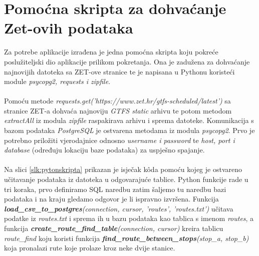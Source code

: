 \documentclass[zavrsnirad]{fer}
\begin{document}
\section{Pomoćna skripta za dohvaćanje Zet-ovih podataka}
\label{sec:skripta}
Za potrebe aplikacije izrađena je jedna pomoćna skripta koju pokreće poslužiteljski dio aplikacije prilikom pokretanja. Ona je zadužena za dohvaćanje najnovijih datoteka sa ZET-ove stranice te je napisana u Pythonu koristeći module \textit{psycopg2, requests i zipfile}.\\\\
Pomoću metode \textit{requests.get('https://www.zet.hr/gtfs-scheduled/latest')} sa stranice ZET-a dohvaća najnoviju \textit{GTFS static} arhivu te potom metodom \textit{extractAll} iz modula \textit{zipfile} raspakirava arhivu i sprema datoteke. Komunikacija s bazom podataka \textit{PostgreSQL} je ostvarena metodama iz modula \textit{psycopg2}. Prvo je potrebno priložiti vjerodajnice odnosno \textit{username i password} te \textit{host, port i database} (određuju lokaciju baze podataka) za uspješno spajanje.\\\\
Na slici \ref{slk:pytonskripta} prikazan je isječak k\^oda pomoću kojeg je ostvareno učitavanje podataka iz datoteka u odgovarajuće tablice. Python funkcije rade u tri koraka, prvo definiramo SQL naredbu zatim šaljemo tu naredbu bazi podataka i na kraju gledamo odgovor je li ispravno izvršena. Funkcija \textit{\textbf{load\_csv\_to\_postgres}(connection, cursor, 'routes', 'routes.txt')} učitava podatke iz \textit{routes.txt}  i sprema ih u bazu podataka kao tablica s imenom \textit{routes}, a funkcija \textit{\textbf{create\_route\_find\_table}(connection, cursor)} kreira tablicu \textit{route\_find} koju koristi funkcija \textit{\textbf{find\_route\_between\_stops}(stop\_a, stop\_b)} koja pronalazi rute koje prolaze kroz neke dvije stanice.
\end{document}
